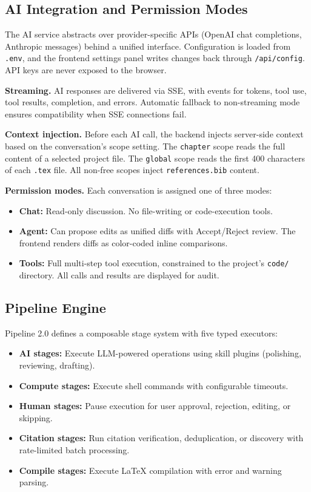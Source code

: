 \documentclass[11pt,a4paper]{article}
\begin{document}
\subsection{AI Integration and Permission Modes}

The AI service abstracts over provider-specific APIs (OpenAI chat completions,
Anthropic messages) behind a unified interface. Configuration is loaded from
\texttt{.env}, and the frontend settings panel writes changes back through
\texttt{/api/config}. API keys are never exposed to the browser.

\textbf{Streaming.} AI responses are delivered via SSE, with events for tokens,
tool use, tool results, completion, and errors. Automatic fallback to
non-streaming mode ensures compatibility when SSE connections fail.

\textbf{Context injection.} Before each AI call, the backend injects
server-side context based on the conversation's scope setting. The
\texttt{chapter} scope reads the full content of a selected project file. The
\texttt{global} scope reads the first 400 characters of each \texttt{.tex}
file. All non-free scopes inject \texttt{references.bib} content.

\textbf{Permission modes.} Each conversation is assigned one of three modes:
\begin{itemize}
  \item \textbf{Chat:} Read-only discussion. No file-writing or code-execution
  tools.
  \item \textbf{Agent:} Can propose edits as unified diffs with Accept/Reject
  review. The frontend renders diffs as color-coded inline comparisons.
  \item \textbf{Tools:} Full multi-step tool execution, constrained to the
  project's \texttt{code/} directory. All calls and results are displayed for
  audit.
\end{itemize}

\subsection{Pipeline Engine}

Pipeline 2.0 defines a composable stage system with five typed executors:

\begin{itemize}
  \item \textbf{AI stages:} Execute LLM-powered operations using skill plugins
  (polishing, reviewing, drafting).
  \item \textbf{Compute stages:} Execute shell commands with configurable
  timeouts.
  \item \textbf{Human stages:} Pause execution for user approval, rejection,
  editing, or skipping.
  \item \textbf{Citation stages:} Run citation verification, deduplication, or
  discovery with rate-limited batch processing.
  \item \textbf{Compile stages:} Execute \LaTeX{} compilation with error and
  warning parsing.
\end{itemize}
\end{document}
